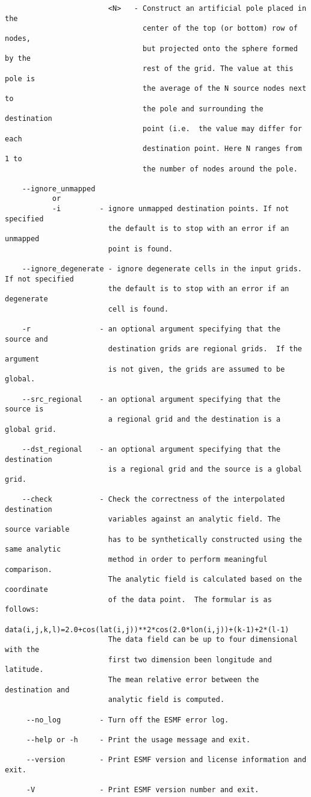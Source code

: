 \begin{verbatim}
                        <N>   - Construct an artificial pole placed in the
                                center of the top (or bottom) row of nodes,
                                but projected onto the sphere formed by the
                                rest of the grid. The value at this pole is
                                the average of the N source nodes next to
                                the pole and surrounding the destination
                                point (i.e.  the value may differ for each
                                destination point. Here N ranges from 1 to
                                the number of nodes around the pole.

    --ignore_unmapped
           or
           -i         - ignore unmapped destination points. If not specified
                        the default is to stop with an error if an unmapped
                        point is found.

    --ignore_degenerate - ignore degenerate cells in the input grids. If not specified
                        the default is to stop with an error if an degenerate
                        cell is found.

    -r                - an optional argument specifying that the source and
                        destination grids are regional grids.  If the argument
                        is not given, the grids are assumed to be global.

    --src_regional    - an optional argument specifying that the source is
                        a regional grid and the destination is a global grid.

    --dst_regional    - an optional argument specifying that the destination
                        is a regional grid and the source is a global grid.

    --check           - Check the correctness of the interpolated destination 
                        variables against an analytic field. The source variable 
                        has to be synthetically constructed using the same analytic
                        method in order to perform meaningful comparison.
                        The analytic field is calculated based on the coordinate
                        of the data point.  The formular is as follows:
                        data(i,j,k,l)=2.0+cos(lat(i,j))**2*cos(2.0*lon(i,j))+(k-1)+2*(l-1)
                        The data field can be up to four dimensional with the
                        first two dimension been longitude and latitude.
                        The mean relative error between the destination and 
                        analytic field is computed.

     --no_log         - Turn off the ESMF error log.

     --help or -h     - Print the usage message and exit.

     --version        - Print ESMF version and license information and exit.

     -V               - Print ESMF version number and exit.
\end{verbatim}


